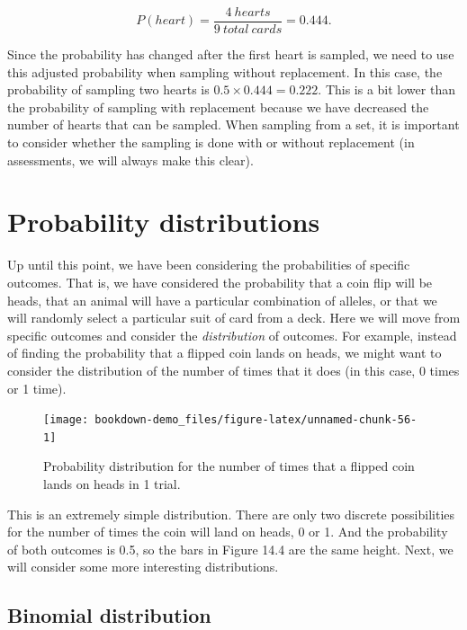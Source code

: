 \documentclass[
]{scrbook}
\begin{document}
\[P(heart) = \frac{4\:hearts}{9\:total\:cards} = 0.444.\]

Since the probability has changed after the first heart is sampled, we need to use this adjusted probability when sampling without replacement.
In this case, the probability of sampling two hearts is \(0.5 \times 0.444 = 0.222\).
This is a bit lower than the probability of sampling with replacement because we have decreased the number of hearts that can be sampled.
When sampling from a set, it is important to consider whether the sampling is done with or without replacement (in assessments, we will always make this clear).

\hypertarget{probability-distributions}{%
\section{Probability distributions}\label{probability-distributions}}

Up until this point, we have been considering the probabilities of specific outcomes.
That is, we have considered the probability that a coin flip will be heads, that an animal will have a particular combination of alleles, or that we will randomly select a particular suit of card from a deck.
Here we will move from specific outcomes and consider the \emph{distribution} of outcomes.
For example, instead of finding the probability that a flipped coin lands on heads, we might want to consider the distribution of the number of times that it does (in this case, 0 times or 1 time).

\begin{figure}
\texttt{[image: bookdown-demo\_files/figure-latex/unnamed-chunk-56-1]} \caption{Probability distribution for the number of times that a flipped coin lands on heads in 1 trial.}\label{fig:unnamed-chunk-56}
\end{figure}

This is an extremely simple distribution.
There are only two discrete possibilities for the number of times the coin will land on heads, 0 or 1.
And the probability of both outcomes is 0.5, so the bars in Figure 14.4 are the same height.
Next, we will consider some more interesting distributions.

\hypertarget{binomial-distribution}{%
\subsection{Binomial distribution}\label{binomial-distribution}}
\end{document}

